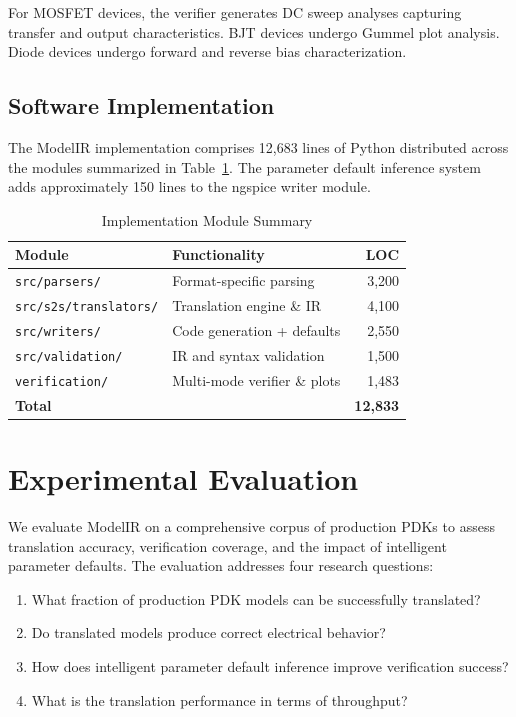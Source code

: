 \documentclass[conference]{IEEEtran}
\begin{document}
For MOSFET devices, the verifier generates DC sweep analyses capturing transfer and output characteristics. BJT devices undergo Gummel plot analysis. Diode devices undergo forward and reverse bias characterization.

\subsection{Software Implementation}

The ModelIR implementation comprises 12,683 lines of Python distributed across the modules summarized in Table~\ref{tab:implementation}. The parameter default inference system adds approximately 150 lines to the ngspice writer module.

\begin{table}[!t]
\caption{Implementation Module Summary}
\label{tab:implementation}
\centering
\renewcommand{\arraystretch}{1.15}
\begin{tabular}{@{}llr@{}}
\toprule
\textbf{Module} & \textbf{Functionality} & \textbf{LOC} \\
\midrule
\texttt{src/parsers/} & Format-specific parsing & 3,200 \\
\texttt{src/s2s/translators/} & Translation engine \& IR & 4,100 \\
\texttt{src/writers/} & Code generation + defaults & 2,550 \\
\texttt{src/validation/} & IR and syntax validation & 1,500 \\
\texttt{verification/} & Multi-mode verifier \& plots & 1,483 \\
\midrule
\textbf{Total} & & \textbf{12,833} \\
\bottomrule
\end{tabular}
\end{table}

\section{Experimental Evaluation}
\label{sec:evaluation}

We evaluate ModelIR on a comprehensive corpus of production PDKs to assess translation accuracy, verification coverage, and the impact of intelligent parameter defaults. The evaluation addresses four research questions:

\begin{enumerate}
\item What fraction of production PDK models can be successfully translated?
\item Do translated models produce correct electrical behavior?
\item How does intelligent parameter default inference improve verification success?
\item What is the translation performance in terms of throughput?
\end{enumerate}
\end{document}
